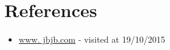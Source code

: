 
\section{References}

\begin{itemize}
    \large
    \raggedright
    \item \url{www. jbjb.com} - visited at 19/10/2015
\end{itemize}




